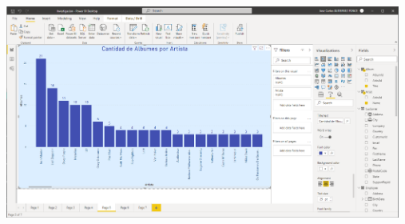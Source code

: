 \documentclass{article}
\begin{document}
\begin{enumerate}[\tab 1.]
\begin{itemize}
\begin{center}
                \includegraphics[width=13cm]{./images/23.2.png}
            \end{center}
            \newpage
            

\end{itemize}
\end{enumerate}
\end{document}
